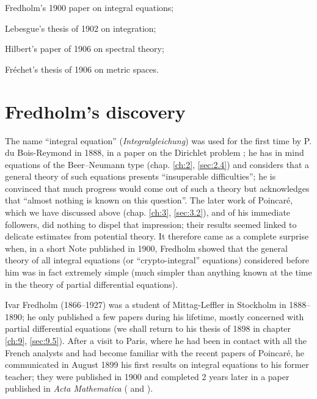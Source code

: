\documentclass[12pt,a4paper,leqno,twoside]{extbook}
\begin{document}
Fredholm's 1900 paper on integral equations;

Lebesgue's thesis of 1902 on integration;

Hilbert's paper of 1906 on spectral theory;

Fréchet's thesis of 1906 on metric spaces.

\section{Fredholm's discovery}
\label{sec:5.1}

The name ``integral equation'' (\emph{Integralgleichung}) was used for the first time by P. du Bois-Reymond in 1888, in a paper on the Dirichlet problem \cite{061}; he has in mind equations of the Beer--Neumann type (chap. \ref{ch:2}, \ref{sec:2.4}) and considers that a general theory of such equations presents ``insuperable difficulties''; he is convinced that much progress would come out of such a theory but acknowledges that ``almost nothing is known on this question''. The later work of Poincaré, which we have discussed above (chap. \ref{ch:3}, \ref{sec:3.2}), and of his immediate followers, did nothing to dispel that impression; their results seemed linked to delicate estimates from potential theory. It therefore came as a complete surprise when, in a short Note published in 1900, Fredholm showed that the general theory of all integral equations (or ``crypto-integral'' equations) considered before him was in fact extremely simple (much simpler than anything known at the time in the theory of partial differential equations).

Ivar Fredholm (1866--1927) was a student of Mittag-Leffler in Stockholm in 1888--1890; he only published a few papers during his lifetime, mostly concerned with partial differential equations (we shall return to his thesis of 1898 in chapter \ref{ch:9}, \ref{sec:9.5}). After a visit to Paris, where he had been in contact with all the French analysts and had become familiar with the recent papers of Poincaré, he communicated in August 1899 his first results on integral equations to his former teacher; they were published in 1900 \cite[p.~61--68]{074} and completed 2 years later in a paper published in \emph{Acta Mathematica} (\cite[p.~81--106]{074} and \cite{075}).
\end{document}
